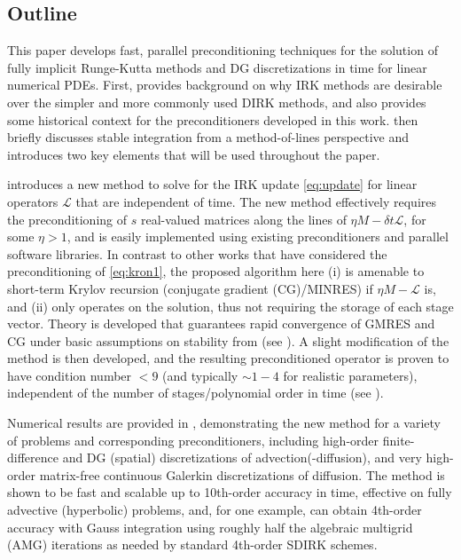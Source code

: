 \documentclass[review]{siamart}
\begin{document}
\subsection{Outline}\label{sec:intro:outline}

This paper develops fast, parallel preconditioning techniques for the solution of
fully implicit Runge-Kutta methods and DG discretizations in time
for linear numerical PDEs.
First,  provides background on why IRK methods are desirable
over the simpler and more commonly used DIRK methods, and also provides some
historical context for the preconditioners developed in this work.
 then briefly discusses stable integration from
a method-of-lines perspective and introduces two key elements that will be
used throughout the paper.

 introduces a new method to solve for the IRK update
\eqref{eq:update} for linear operators $\mathcal{L}$ that are independent of time.
The new method effectively
requires the preconditioning of $s$ real-valued matrices along the lines of
$\eta M - \delta t\mathcal{L}$, for some $\eta > 1$, and is easily implemented
using existing preconditioners and parallel software libraries.
In contrast to other works that have considered the preconditioning of \eqref{eq:kron1},
the proposed algorithm here (i) is amenable to short-term Krylov recursion (conjugate
gradient (CG)/MINRES) if $\eta M - \mathcal{L}$ is, and (ii) only operates on the solution,
thus not requiring the storage of each stage vector. Theory is developed
that guarantees rapid convergence of GMRES and CG under basic assumptions
on stability from  (see ). A slight
modification of the method is then developed, and the resulting preconditioned
operator is proven to have condition number $<9$ (and typically $\sim1-4$ for
realistic parameters), independent of the number of
stages/polynomial order in time (see ).

Numerical results are provided in , demonstrating the new
method for a variety of problems and corresponding preconditioners, including
high-order finite-difference and DG (spatial) discretizations of
advection(-diffusion), and very high-order matrix-free continuous Galerkin
discretizations of diffusion. The method is shown to be fast and scalable
up to 10th-order accuracy in time, effective on fully advective (hyperbolic)
problems, and, for one example, can obtain 4th-order accuracy with Gauss
integration using roughly half the algebraic multigrid (AMG) iterations
as needed by standard 4th-order SDIRK schemes.
\end{document}
